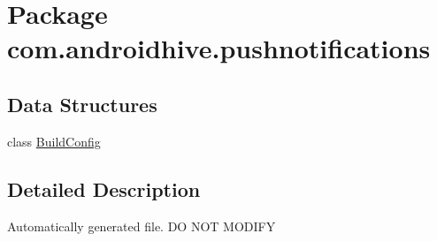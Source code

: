 \hypertarget{namespacecom_1_1androidhive_1_1pushnotifications}{\section{Package com.\-androidhive.\-pushnotifications}
\label{namespacecom_1_1androidhive_1_1pushnotifications}
}
\subsection*{Data Structures}
\begin{DoxyCompactItemize}
\item 
class \hyperlink{classcom_1_1androidhive_1_1pushnotifications_1_1_build_config}{Build\-Config}
\end{DoxyCompactItemize}


\subsection{Detailed Description}
Automatically generated file. D\-O N\-O\-T M\-O\-D\-I\-F\-Y 